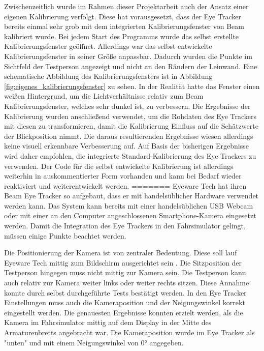 Zwischenzeitlich wurde im Rahmen dieser Projektarbeit auch der Ansatz einer eigenen Kalibrierung verfolgt. Diese hat vorausgesetzt, dass der Eye Tracker bereits einmal sehr grob mit dem integrierten Kalibrierungsfenster von Beam kalibriert wurde. Bei jedem Start des Programms wurde das selbst erstellte Kalibrierungsfenster geöffnet. Allerdings war das selbst entwickelte Kalibrierungsfenster in seiner Größe anpassbar. Dadurch wurden die Punkte im Sichtfeld der Testperson angezeigt und nicht an den Rändern der Leinwand. Eine schematische Abbildung des Kalibrierungsfensters ist in Abbildung \ref{fig:eigenes_kalibrierungsfenster} zu sehen. In der Realität hatte das Fenster einen weißen Hintergrund, um die Lichtverhältnisse relativ zum Beam Kalibrierungsfenster, welches sehr dunkel ist, zu verbessern. Die Ergebnisse der Kalibrierung wurden anschließend verwendet, um die Rohdaten des Eye Trackers mit diesen zu transformieren, damit die Kalibrierung Einfluss auf die Schätzwerte der Blickposition nimmt. Die daraus resultierenden Ergebnisse wiesen allerdings keine visuell erkennbare Verbesserung auf. Auf Basis der bisherigen Ergebnisse wird daher empfohlen, die integrierte Standard-Kalibrierung des Eye Trackers zu verwenden. Der Code für die selbst entwickelte Kalibrierung ist allerdings weiterhin in auskommentierter Form vorhanden und kann bei Bedarf wieder reaktiviert und weiterentwickelt werden. 
=======
Eyeware Tech hat ihren Beam Eye Tracker so aufgebaut, dass er mit handelsüblicher Hardware verwendet werden kann. Das System kann bereits mit einer handelsüblichen {\ac{USB}} Webcam oder mit einer an den Computer angeschlossenen Smartphone-Kamera eingesetzt werden. Damit die Integration des Eye Trackers in den Fahrsimulator gelingt, müssen einige Punkte beachtet werden. 

Die Positionierung der Kamera ist von zentraler Bedeutung. Diese soll lauf Eyeware Tech mittig zum Bildschirm ausgerichtet sein \cite{lit_software_beam_eyetracker}. Die Sitzposition der Testperson hingegen muss nicht mittig zur Kamera sein. Die Testperson kann auch relativ zur Kamera weiter links oder weiter rechts sitzen. Diese Annahme konnte durch selbst durchgeführte Tests bestätigt werden. 
In den Eye Tracker Einstellungen muss auch die Kameraposition und der Neigungswinkel korrekt eingestellt werden. Die genauesten Ergebnisse konnten erzielt werden, als die Kamera im Fahrsimulator mittig auf dem Display in der Mitte des Armaturenbretts angebracht war. Die Kameraposition wurde im Eye Tracker als "unten" und mit einem Neigungswinkel von 0° angegeben.

